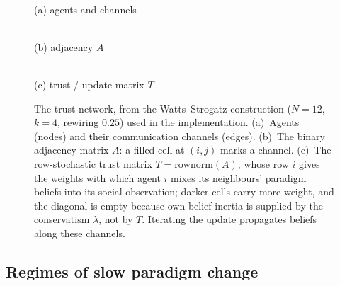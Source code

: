 \documentclass[11pt,a4paper]{article}
\begin{document}
\begin{figure}[t]
\centering
\begin{minipage}[b]{0.35\textwidth}\centering
\begin{tikzpicture}[scale=0.92]

\end{tikzpicture}\\[2pt]
{\footnotesize (a) agents and channels}
\end{minipage}\hfill
\begin{minipage}[b]{0.31\textwidth}\centering
{}\\[2pt]
{\footnotesize (b) adjacency $A$}
\end{minipage}\hfill
\begin{minipage}[b]{0.31\textwidth}\centering
{}\\[2pt]
{\footnotesize (c) trust / update matrix $T$}
\end{minipage}
\caption{The trust network, from the Watts--Strogatz construction
($N{=}12$, $k{=}4$, rewiring $0.25$) used in the implementation. (a)~Agents
(nodes) and their communication channels (edges). (b)~The binary adjacency matrix
$A$: a filled cell at $(i,j)$ marks a channel. (c)~The row-stochastic trust matrix
$T=\mathrm{rownorm}(A)$, whose row $i$ gives the weights with which agent $i$ mixes
its neighbours' paradigm beliefs into its social observation; darker cells carry
more weight, and the diagonal is empty because own-belief inertia is supplied by the
conservatism $\lambda$, not by $T$. Iterating the update propagates beliefs along
these channels.}
\label{fig:trust}
\end{figure}

\subsection{Regimes of slow paradigm change}
\label{ssec:regimes}
\end{document}
